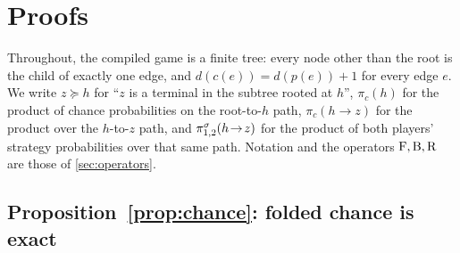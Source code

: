 \section{Proofs}
\label{app:proofs}

Throughout, the compiled game is a finite tree: every node other than the root is the
child of exactly one edge, and $d(c(e)) = d(p(e)) + 1$ for every edge $e$. We write
$z \succeq h$ for ``$z$ is a terminal in the subtree rooted at $h$'', $\pi_c(h)$ for the
product of chance probabilities on the root-to-$h$ path, $\pi_c(h \!\to\! z)$ for the
product over the $h$-to-$z$ path, and $\pi^{\sigma}_{1,2}(h \!\to\! z)$ for the
product of both players' strategy probabilities over that same path. Notation and the
operators $\mathrm{F}, \mathrm{B}, \mathrm{R}$ are those of \cref{sec:operators}.

\subsection{Proposition~\ref{prop:chance}: folded chance is exact}

